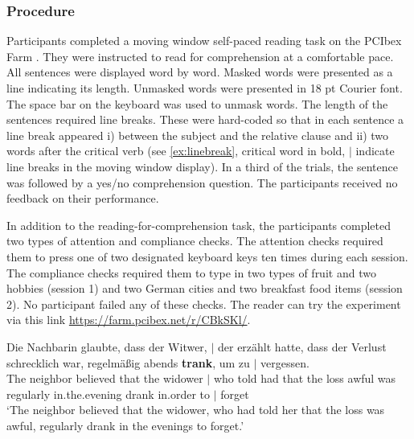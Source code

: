 \documentclass[review,preprint,12pt,authoryear,floatsintext]{elsarticle}
\begin{document}
\subsubsection*{Procedure}
Participants completed a moving window self-paced reading task \citep{just_etal_1982} on the PCIbex Farm \citep{pcibex}. They were instructed to read for comprehension at a comfortable pace. All sentences were displayed word by word. Masked words were presented as a line indicating its length. Unmasked words were presented in 18 pt Courier font. The space bar on the keyboard was used to unmask words. The length of the sentences required line breaks. These were hard-coded so that in each sentence a line break appeared i) between the subject and the relative clause and ii) two words after the critical verb (see \ref{ex:linebreak}, critical word in bold, $\mid$ indicate line breaks in the moving window display). In a third of the trials, the sentence was followed by a yes/no comprehension question. The participants received no feedback on their performance.

In addition to the reading-for-comprehension task, the participants completed two types of attention and compliance checks. The attention checks required them to press one of two designated keyboard keys ten times during each session. The compliance checks required them to type in two types of fruit and two hobbies (session 1) and two German cities and two breakfast food items (session 2). No participant failed any of these checks. The reader can try the experiment via this link \hyperlink{https://farm.pcibex.net/r/CBkSKl/}{https://farm.pcibex.net/r/CBkSKl/}. 

\begin{exe}  
\ex \label{ex:linebreak}
    \gll Die Nachbarin glaubte, dass der Witwer, $\mid$ der erzählt hatte, dass der Verlust schrecklich war, regelmäßig abends \textbf{trank}, um zu $\mid$  vergessen. \\ 
    The neighbor believed that the widower $\mid$  who told had that the loss awful was regularly in.the.evening drank in.order to $\mid$  forget\\
    \trans  `The neighbor believed that the widower, who had told her that the loss was awful, regularly drank in the evenings to forget.'\\  
\end{exe}
\end{document}

